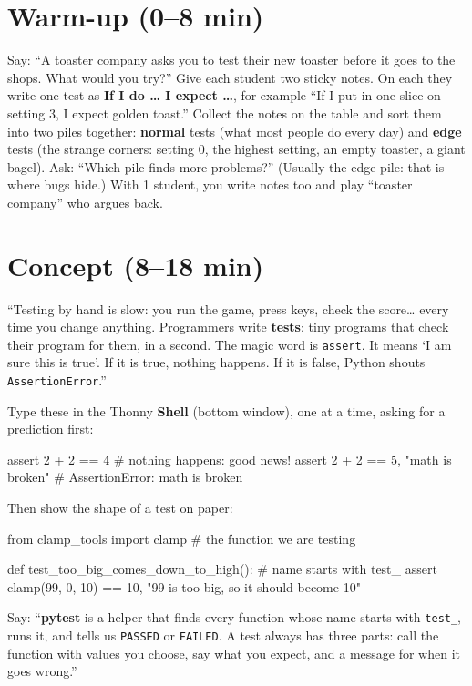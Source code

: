 \section{Warm-up (0--8 min)}
\begin{unplugged}
Say: \enquote{A toaster company asks you to test their new toaster before it goes to the shops. What would you try?}
Give each student two sticky notes. On each they write one test as \textbf{If I do \ldots{} I expect \ldots}, for example
\enquote{If I put in one slice on setting 3, I expect golden toast.}
Collect the notes on the table and sort them into two piles together:
\textbf{normal} tests (what most people do every day) and \textbf{edge} tests (the strange corners: setting 0, the highest setting, an empty toaster, a giant bagel).
Ask: \enquote{Which pile finds more problems?} (Usually the edge pile: that is where bugs hide.)
With 1 student, you write notes too and play \enquote{toaster company} who argues back.
\end{unplugged}

\section{Concept (8--18 min)}
\begin{teacherscript}[Say]
\enquote{Testing by hand is slow: you run the game, press keys, check the score\ldots{} every time you change anything. Programmers write
\textbf{tests}: tiny programs that check their program for them, in a second. The magic word is \texttt{assert}. It means
\enquote{I am sure this is true}. If it is true, nothing happens. If it is false, Python shouts \texttt{AssertionError}.}
\end{teacherscript}
Type these in the Thonny \textbf{Shell} (bottom window), one at a time, asking for a prediction first:
\begin{pycode}
assert 2 + 2 == 4                       # nothing happens: good news!
assert 2 + 2 == 5, "math is broken"    # AssertionError: math is broken
\end{pycode}
Then show the shape of a test on paper:
\begin{pycode}
from clamp_tools import clamp           # the function we are testing

def test_too_big_comes_down_to_high():  # name starts with test_
    assert clamp(99, 0, 10) == 10, "99 is too big, so it should become 10"
\end{pycode}
Say: \enquote{\textbf{pytest} is a helper that finds every function whose name starts with \texttt{test\_}, runs it, and tells us
\texttt{PASSED} or \texttt{FAILED}. A test always has three parts: call the function with values you choose, say what you expect, and a message for
when it goes wrong.}

